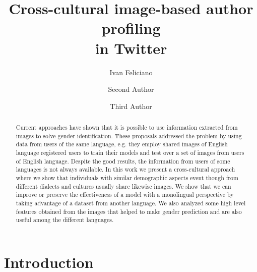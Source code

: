 \documentclass[runningheads]{llncs}
\begin{document}
%
\title{Cross-cultural image-based author profiling\\ in Twitter}


\author{Ivan Feliciano \and
Second Author \and
Third Author}
%
%

\maketitle

\begin{abstract}

Current approaches have shown that it is possible to use information extracted from images to solve gender identification. These proposals addressed the problem by using data from users of the same language, e.g. they employ shared images of English language registered users to train their models and test over a set of images from users of English language. Despite the good results, the information from users of some languages is not always available. In this work we present a cross-cultural approach where we show that individuals with similar demographic aspects event though from different dialects and cultures usually share likewise images. We show that we can improve or preserve the effectiveness of a model with a monolingual perspective by taking advantage of a dataset from another language. We also analyzed some high level features obtained from the images that helped to make gender prediction and are also useful among the different languages.
\end{abstract}

\section{Introduction}
\end{document}
